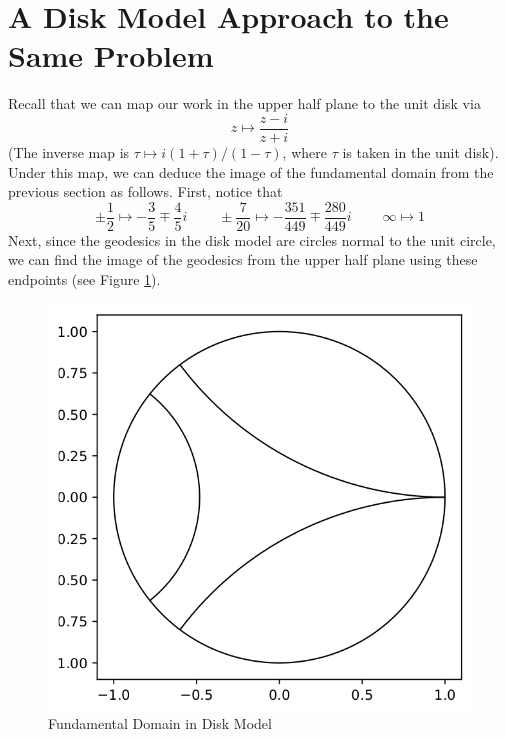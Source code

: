 \documentclass[]{article}
\begin{document}
\section{A Disk Model Approach to the Same Problem}

Recall that we can map our work in the upper half plane to the unit disk via
$$
z \mapsto \frac{z - i}{z + i}
$$
(The inverse map is $\tau \mapsto i(1+\tau)/(1-\tau)$, where $\tau$ is taken in the unit disk).
Under this map, we can deduce the image of the fundamental domain from the previous section as follows.
First, notice that
$$
\pm\frac{1}{2} \mapsto -\frac{3}{5} \mp \frac{4}{5}i ~~~~~~~~~~
\pm\frac{7}{20} \mapsto -\frac{351}{449} \mp \frac{280}{449}i ~~~~~~~~~~
\infty \mapsto 1
$$
Next, since the geodesics in the disk model are circles normal to the unit circle, we can find the image of the geodesics from the upper half plane using these endpoints (see Figure \ref{fundDomainDisk}).
\begin{figure}[h]
	\centering
	\includegraphics[width=0.7\linewidth]{fundDomainDisk.png}
	\caption{Fundamental Domain in Disk Model}
	\label{fundDomainDisk}
\end{figure}
\end{document}

